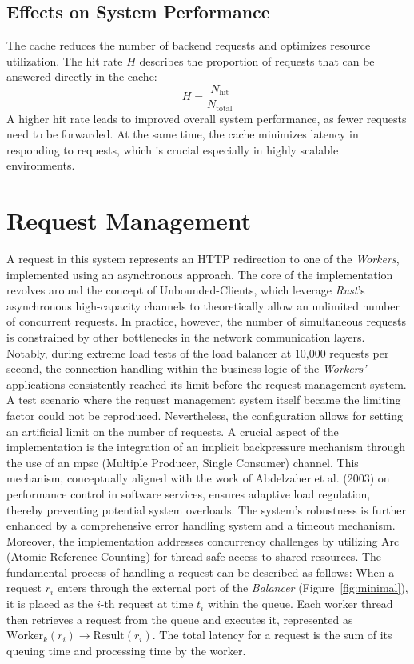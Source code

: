 \documentclass[twocolumn]{webofc}
\begin{document}
\subsection{Effects on System Performance}
The cache reduces the number of backend requests and optimizes resource utilization. The hit rate \( H \) describes the proportion of requests that can be answered directly in the cache:
\[
    H = \frac{N_{\text{hit}}}{N_{\text{total}}}
\]
A higher hit rate leads to improved overall system performance, as fewer requests need to be forwarded. At the same time, the cache minimizes latency in responding to requests, which is crucial especially in highly scalable environments\cite{tanenbaum2007distributed}.

\section{Request Management}
A request in this system represents an HTTP redirection to one of the \textit{Workers}, implemented using an asynchronous approach. The core of the implementation revolves around the concept of Unbounded-Clients, which leverage \textit{Rust}'s asynchronous high-capacity channels to theoretically allow an unlimited number of concurrent requests. In practice, however, the number of simultaneous requests is constrained by other bottlenecks in the network communication layers. Notably, during extreme load tests of the load balancer at 10,000 requests per second, the connection handling within the business logic of the \textit{Workers'} applications consistently reached its limit before the request management system. A test scenario where the request management system itself became the limiting factor could not be reproduced. Nevertheless, the configuration allows for setting an artificial limit on the number of requests. A crucial aspect of the implementation is the integration of an implicit backpressure mechanism through the use of an mpsc (Multiple Producer, Single Consumer) channel. This mechanism, conceptually aligned with the work of Abdelzaher et al. (2003) on performance control in software services, ensures adaptive load regulation, thereby preventing potential system overloads\cite{backpressure}. The system's robustness is further enhanced by a comprehensive error handling system and a timeout mechanism. Moreover, the implementation addresses concurrency challenges by utilizing Arc (Atomic Reference Counting) for thread-safe access to shared resources. The fundamental process of handling a request can be described as follows: When a request \( r_i \) enters through the external port of the \textit{Balancer} (Figure~\ref{fig:minimal}), it is placed as the \( i \)-th request at time \( t_i \) within the queue. Each worker thread then retrieves a request from the queue and executes it, represented as \( \text{Worker}_k(r_i) \rightarrow \text{Result}(r_i) \). The total latency for a request is the sum of its queuing time and processing time by the worker.
\end{document}
